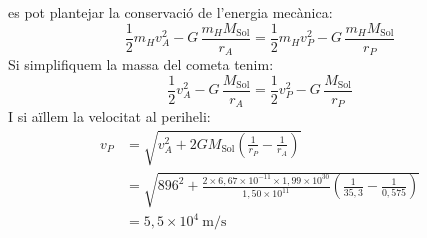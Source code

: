 \begin{solapartat}
 es pot plantejar la conservació de l'energia mecànica:
\[ \frac{1}{2} m_H v_A^2 - G\,\frac{m_H M_\mathrm{Sol}}{r_A} = \frac{1}{2} m_H v_P^2 - G\,\frac{m_H M_\mathrm{Sol}}{r_P} \]
Si simplifiquem la massa del cometa tenim:
\[ \frac{1}{2} v_A^2 - G\,\frac{M_\mathrm{Sol}}{r_A} = \frac{1}{2} v_P^2 - G\,\frac{M_\mathrm{Sol}}{r_P} \]
I si aïllem la velocitat al periheli:
\begin{align*}
v_P &= \sqrt{v_A^2 + 2 G M_\mathrm{Sol}\left(\frac{1}{r_P} - \frac{1}{r_A}\right)}\\
&= \sqrt{896^2 + \frac{2\times 6,67\times 10^{-11}\times 1,99\times 10^{30}}{1,50\times 10^{11}}\left(\frac{1}{35,3} - \frac{1}{0,575}\right)}\\
&= 5,5\times 10^{4}\ \mathrm{m/s}
\end{align*}
\end{solapartat}
